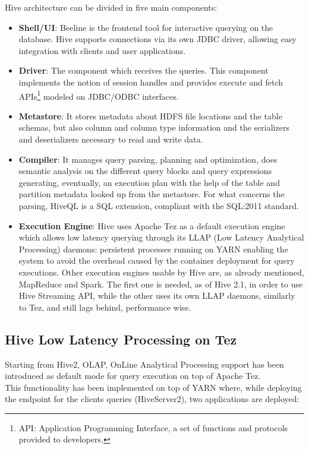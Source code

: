 Hive architecture can be divided in five main components:

\begin{itemize}
    \item \textbf{Shell/UI}: Beeline is the frontend tool for interactive querying on the database. Hive supports connections via its own JDBC driver, allowing easy integration with clients and user applications.
    \item \textbf{Driver}: The component which receives the queries. This component implements the notion of session handles and provides execute and fetch APIs\footnote{API: Application Programming Interface, a set of functions and protocols provided to developers.} modeled on JDBC/ODBC interfaces.
    \item \textbf{Metastore}: It stores metadata about HDFS file locations and the table schemas, but also column and column type information and the serializers and deserializers necessary to read and write data.
    \item \textbf{Compiler}: It manages query parsing, planning and optimization, does semantic analysis on the different query blocks and query expressions generating, eventually, an execution plan with the help of the table and partition metadata looked up from the metastore. For what concerns the parsing, HiveQL is a SQL extension, compliant with the SQL:2011 standard.
    \item \textbf{Execution Engine}: Hive uses Apache Tez as a default execution engine  which allows low latency querying through its LLAP (Low Latency Analytical Processing) daemons: persistent processes running on YARN enabling the system to avoid the overhead caused by the container deployment for query executions. Other execution engines usable by Hive are, as already mentioned, MapReduce and Spark. The first one is needed, as of Hive 2.1, in order to use Hive Streaming API, while the other uses its own LLAP daemons, similarly to Tez, and still lags behind, performance wise.
\end{itemize}

\subsection{Hive Low Latency Processing on Tez}

Starting from Hive2, OLAP, OnLine Analytical Processing support has been introduced as default mode for query execution on top of Apache Tez.\\  
This functionality has been implemented on top of YARN where, while deploying the endpoint for the clients queries (HiveServer2), two applications are deployed: 

